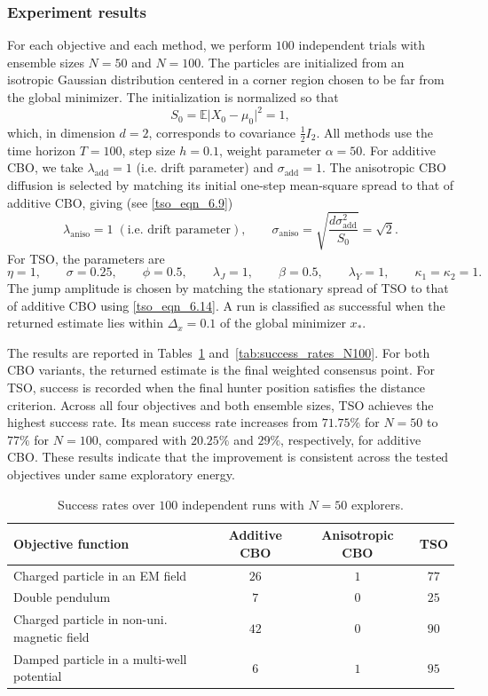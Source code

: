 \documentclass{article}
\numberwithin{equation}{section}
\begin{document}
\subsubsection{Experiment results}
 For each objective and each method, we perform $100$ independent trials with ensemble sizes $N=50$ and $N=100$. The particles are initialized from an isotropic Gaussian distribution centered in a corner region chosen to be far from the global minimizer. The initialization is normalized so that
$$
S_0=\mathbb{E}\lvert X_0-\mu_0\rvert^2=1,
$$
which, in dimension $d=2$, corresponds to covariance $\tfrac{1}{2} I_2$. All methods use the time horizon $T=100$, step size $h=0.1$, weight parameter $\alpha=50$. For additive CBO, we take $\lambda_{\mathrm{add}}=1$ (i.e. drift parameter) and $
\sigma_{\mathrm{add}}=1.$ 
The anisotropic CBO diffusion is selected by matching its initial one-step mean-square spread to that of additive CBO, giving (see \eqref{tso_eqn_6.9})
$$
\lambda_{\mathrm{aniso}}=1\; (\text{i.e. drift parameter}),
\qquad
\sigma_{\mathrm{aniso}}
=\sqrt{\frac{d\sigma_{\mathrm{add}}^2}{S_0}}
=\sqrt{2}.
$$
For TSO, the parameters are
$$
\eta=1,\qquad
\sigma=0.25,\qquad
\phi=0.5,\qquad
\lambda_J=1,\qquad
\beta=0.5,\qquad
\lambda_Y=1,\qquad
\kappa_1=\kappa_2=1.
$$
The jump amplitude is chosen by matching the stationary spread of TSO to that of additive CBO using \eqref{tso_eqn_6.14}. 
A run is classified as successful when the returned estimate lies within $\Delta_x=0.1$ of the global minimizer $x_\ast$. 

The results are reported in Tables~\ref{tab:distance_success_sigma1_gaussian} and~\ref{tab:success_rates_N100}. For both CBO variants, the returned estimate is the final weighted consensus point. For TSO, success is recorded when the final hunter position satisfies the distance criterion. Across all four objectives and both ensemble sizes, TSO achieves the highest success rate. Its mean success rate increases from $71.75\%$ for $N=50$ to $77\%$ for $N=100$, compared with $20.25\%$ and $29\%$, respectively, for additive CBO.  These results indicate that the improvement is consistent across the tested objectives under same exploratory energy.

\begin{table}[H]
    \centering
    \caption{Success rates over $100$ independent runs with $N = 50$ explorers.}
    \label{tab:distance_success_sigma1_gaussian}
    \begin{tabular}{l c c c}
        \toprule
        Objective function & Additive CBO & Anisotropic CBO & TSO \\
        \midrule
        Charged particle in an EM field & $26$ & $1$ & $77$ \\
        Double pendulum                      & $7$  & $0$ & $25$ \\
        Charged particle in non-uni. magnetic field         & $42$ & $0$ & $90$ \\
        Damped particle in a multi-well potential           & $6$  & $1$ & $95$ \\
        \bottomrule
    \end{tabular}
\end{table}
\end{document}
